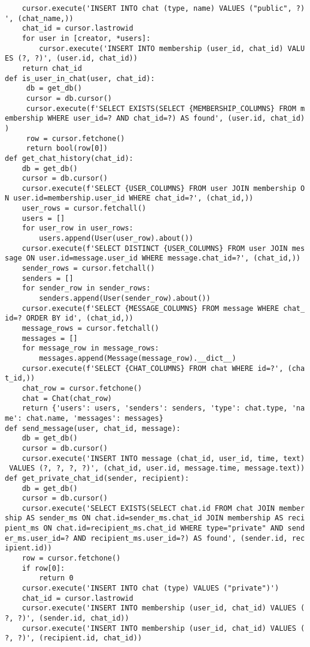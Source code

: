\documentclass[listing]{espd}
\begin{document}
\begin{verbatim}
    cursor.execute('INSERT INTO chat (type, name) VALUES ("public", ?)
', (chat_name,))
    chat_id = cursor.lastrowid
    for user in [creator, *users]:
        cursor.execute('INSERT INTO membership (user_id, chat_id) VALU
ES (?, ?)', (user.id, chat_id))
    return chat_id
def is_user_in_chat(user, chat_id):
     db = get_db()
     cursor = db.cursor()
     cursor.execute(f'SELECT EXISTS(SELECT {MEMBERSHIP_COLUMNS} FROM m
embership WHERE user_id=? AND chat_id=?) AS found', (user.id, chat_id)
)
     row = cursor.fetchone()
     return bool(row[0])
def get_chat_history(chat_id):
    db = get_db()
    cursor = db.cursor()
    cursor.execute(f'SELECT {USER_COLUMNS} FROM user JOIN membership O
N user.id=membership.user_id WHERE chat_id=?', (chat_id,))
    user_rows = cursor.fetchall()
    users = []
    for user_row in user_rows:
        users.append(User(user_row).about())
    cursor.execute(f'SELECT DISTINCT {USER_COLUMNS} FROM user JOIN mes
sage ON user.id=message.user_id WHERE message.chat_id=?', (chat_id,))
    sender_rows = cursor.fetchall()
    senders = []
    for sender_row in sender_rows:
        senders.append(User(sender_row).about())
    cursor.execute(f'SELECT {MESSAGE_COLUMNS} FROM message WHERE chat_
id=? ORDER BY id', (chat_id,))
    message_rows = cursor.fetchall()
    messages = []
    for message_row in message_rows:
        messages.append(Message(message_row).__dict__)
    cursor.execute(f'SELECT {CHAT_COLUMNS} FROM chat WHERE id=?', (cha
t_id,))
    chat_row = cursor.fetchone()
    chat = Chat(chat_row)
    return {'users': users, 'senders': senders, 'type': chat.type, 'na
me': chat.name, 'messages': messages}
def send_message(user, chat_id, message):
    db = get_db()
    cursor = db.cursor()
    cursor.execute('INSERT INTO message (chat_id, user_id, time, text)
 VALUES (?, ?, ?, ?)', (chat_id, user.id, message.time, message.text))
def get_private_chat_id(sender, recipient):
    db = get_db()
    cursor = db.cursor()
    cursor.execute('SELECT EXISTS(SELECT chat.id FROM chat JOIN member
ship AS sender_ms ON chat.id=sender_ms.chat_id JOIN membership AS reci
pient_ms ON chat.id=recipient_ms.chat_id WHERE type="private" AND send
er_ms.user_id=? AND recipient_ms.user_id=?) AS found', (sender.id, rec
ipient.id))
    row = cursor.fetchone()
    if row[0]:
        return 0
    cursor.execute('INSERT INTO chat (type) VALUES ("private")')
    chat_id = cursor.lastrowid
    cursor.execute('INSERT INTO membership (user_id, chat_id) VALUES (
?, ?)', (sender.id, chat_id))
    cursor.execute('INSERT INTO membership (user_id, chat_id) VALUES (
?, ?)', (recipient.id, chat_id))

\end{verbatim}
\end{document}
